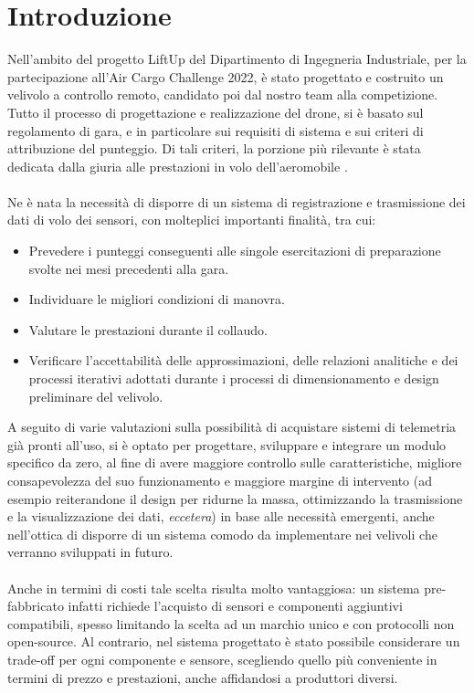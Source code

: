 \documentclass[12pt]{article}
\begin{document}
\section*{Introduzione}
Nell'ambito del progetto LiftUp del Dipartimento di Ingegneria Industriale, per la partecipazione all'Air Cargo Challenge 2022, è stato progettato e costruito un velivolo a controllo remoto, candidato poi dal nostro team alla competizione.
Tutto il processo di progettazione e realizzazione del drone, si è basato sul regolamento di gara, e in particolare sui requisiti di sistema e sui criteri di attribuzione del punteggio. Di tali criteri, la porzione più rilevante è stata dedicata dalla giuria alle prestazioni in volo dell'aeromobile \cite{regulation}. 
\\\\
Ne è nata la necessità di disporre di un sistema di registrazione e trasmissione dei dati di volo dei sensori, con molteplici importanti finalità, tra cui: 

\begin{itemize}
\item Prevedere i punteggi conseguenti alle singole esercitazioni di preparazione svolte nei mesi precedenti alla gara.
\item Individuare le migliori condizioni di manovra.
\item Valutare le prestazioni durante il collaudo.
\item Verificare l'accettabilità delle approssimazioni, delle relazioni analitiche e dei processi iterativi adottati durante i processi di dimensionamento e design preliminare del velivolo.
\end{itemize}

\noindent
A seguito di varie valutazioni sulla possibilità di acquistare sistemi di telemetria già pronti all'uso, si è optato per progettare, sviluppare e integrare un modulo specifico da zero, al fine di avere maggiore controllo sulle caratteristiche, migliore consapevolezza del suo funzionamento e maggiore margine di intervento (ad esempio reiterandone il design per ridurne la massa, ottimizzando la trasmissione e la visualizzazione dei dati, \textit{eccetera}) in base alle necessità emergenti, anche nell'ottica di disporre di un sistema comodo da implementare nei velivoli che verranno sviluppati in futuro.
\\\\
Anche in termini di costi tale scelta risulta molto vantaggiosa: un sistema pre-fabbricato infatti richiede l'acquisto di sensori e componenti aggiuntivi compatibili, spesso limitando la scelta ad un marchio unico e con protocolli non open-source. Al contrario, nel sistema progettato è stato possibile considerare un trade-off per ogni componente e sensore, scegliendo quello più conveniente in termini di prezzo e prestazioni, anche affidandosi a produttori diversi. 
\end{document}
